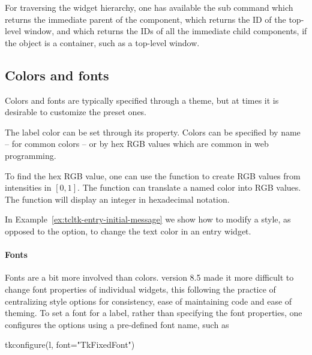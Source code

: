 For traversing the widget hierarchy, one has available the
 sub command which returns the immediate
parent of the component,  which returns
the ID of the top-level window, and 
which returns the IDs of all the immediate child components, if the
object is a container, such as a top-level window.


\subsection{Colors and fonts}
\label{sec:tcltk:overview:colors-fonts}
Colors and fonts are typically specified through a theme, but at times
it is desirable to customize the preset ones.

The label color can be set through its 
property. Colors can be specified by name -- for common colors -- or
by hex RGB values which are common in web programming.
\begin{Schunk}
\end{Schunk}

To find the hex RGB value, one can use the  function to
create RGB values from intensities in $[0,1]$.  The \R\/ function
 can translate a named color into RGB values. The
 function will display an integer in hexadecimal
notation.

In Example~\ref{ex:tcltk-entry-initial-message} we show how to modify
a style, as opposed to the  option, to change the
text color in an entry widget.

\paragraph{Fonts}
Fonts are a bit more involved than colors. \TK\/ version 8.5 made it
more difficult to change font properties of individual widgets, this
following the practice of centralizing style options for consistency,
ease of maintaining code and ease of theming.  To set a font for a
label, rather than specifying the font properties, one configures the
 options using a pre-defined font name, such as
\begin{Schunk}
\begin{Sinput}
 tkconfigure(l, font="TkFixedFont")
\end{Sinput}
\end{Schunk}

